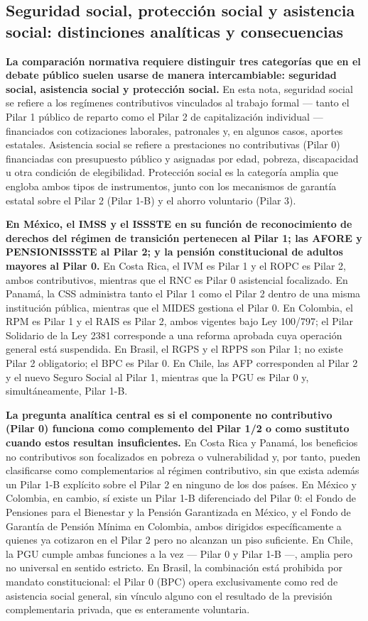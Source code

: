 \documentclass[12pt, letterpaper]{article}
\begin{document}
\subsection{Seguridad social, protección social y asistencia social: distinciones analíticas y consecuencias}

\textbf{La comparación normativa requiere distinguir tres categorías que en el debate público suelen usarse de manera intercambiable: seguridad social, asistencia social y protección social.} En esta nota, seguridad social se refiere a los regímenes contributivos vinculados al trabajo formal --- tanto el Pilar 1 público de reparto como el Pilar 2 de capitalización individual --- financiados con cotizaciones laborales, patronales y, en algunos casos, aportes estatales. Asistencia social se refiere a prestaciones no contributivas (Pilar 0) financiadas con presupuesto público y asignadas por edad, pobreza, discapacidad u otra condición de elegibilidad. Protección social es la categoría amplia que engloba ambos tipos de instrumentos, junto con los mecanismos de garantía estatal sobre el Pilar 2 (Pilar 1-B) y el ahorro voluntario (Pilar 3).

\textbf{En México, el IMSS y el ISSSTE en su función de reconocimiento de derechos del régimen de transición pertenecen al Pilar 1; las AFORE y PENSIONISSSTE al Pilar 2; y la pensión constitucional de adultos mayores al Pilar 0.} En Costa Rica, el IVM es Pilar 1 y el ROPC es Pilar 2, ambos contributivos, mientras que el RNC es Pilar 0 asistencial focalizado. En Panamá, la CSS administra tanto el Pilar 1 como el Pilar 2 dentro de una misma institución pública, mientras que el MIDES gestiona el Pilar 0. En Colombia, el RPM es Pilar 1 y el RAIS es Pilar 2, ambos vigentes bajo Ley 100/797; el Pilar Solidario de la Ley 2381 corresponde a una reforma aprobada cuya operación general está suspendida. En Brasil, el RGPS y el RPPS son Pilar 1; no existe Pilar 2 obligatorio; el BPC es Pilar 0. En Chile, las AFP corresponden al Pilar 2 y el nuevo Seguro Social al Pilar 1, mientras que la PGU es Pilar 0 y, simultáneamente, Pilar 1-B.

\textbf{La pregunta analítica central es si el componente no contributivo (Pilar 0) funciona como complemento del Pilar 1/2 o como sustituto cuando estos resultan insuficientes.} En Costa Rica y Panamá, los beneficios no contributivos son focalizados en pobreza o vulnerabilidad y, por tanto, pueden clasificarse como complementarios al régimen contributivo, sin que exista además un Pilar 1-B explícito sobre el Pilar 2 en ninguno de los dos países. En México y Colombia, en cambio, sí existe un Pilar 1-B diferenciado del Pilar 0: el Fondo de Pensiones para el Bienestar y la Pensión Garantizada en México, y el Fondo de Garantía de Pensión Mínima en Colombia, ambos dirigidos específicamente a quienes ya cotizaron en el Pilar 2 pero no alcanzan un piso suficiente. En Chile, la PGU cumple ambas funciones a la vez --- Pilar 0 y Pilar 1-B ---, amplia pero no universal en sentido estricto. En Brasil, la combinación está prohibida por mandato constitucional: el Pilar 0 (BPC) opera exclusivamente como red de asistencia social general, sin vínculo alguno con el resultado de la previsión complementaria privada, que es enteramente voluntaria.
\end{document}
